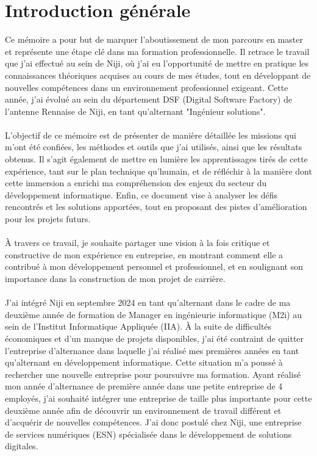 \documentclass[12pt]{article}
\begin{document}
\section{Introduction générale}
Ce mémoire a pour but de marquer l'aboutissement de mon parcours en master et représente une étape clé dans ma formation professionnelle. Il retrace le travail que j’ai effectué au sein de Niji, où j’ai eu l’opportunité de mettre en pratique les connaissances théoriques acquises au cours de mes études, tout en développant de nouvelles compétences dans un environnement professionnel exigeant. Cette année, j'ai évolué au sein du département DSF (Digital Software Factory) de l'antenne Rennaise de Niji, en tant qu'alternant "Ingénieur solutions".
\\\\
L’objectif de ce mémoire est de présenter de manière détaillée les missions qui m’ont été confiées, les méthodes et outils que j’ai utilisés, ainsi que les résultats obtenus. Il s’agit également de mettre en lumière les apprentissages tirés de cette expérience, tant sur le plan technique qu’humain, et de réfléchir à la manière dont cette immersion a enrichi ma compréhension des enjeux du secteur du développement informatique. Enfin, ce document vise à analyser les défis rencontrés et les solutions apportées, tout en proposant des pistes d’amélioration pour les projets futurs.
\\\\
À travers ce travail, je souhaite partager une vision à la fois critique et constructive de mon expérience en entreprise, en montrant comment elle a contribué à mon développement personnel et professionnel, et en soulignant son importance dans la construction de mon projet de carrière.
\\\\
J'ai intégré Niji en septembre 2024 en tant qu'alternant dans le cadre de ma deuxième année de formation de Manager en ingénieurie informatique (M2i) au sein de l'Institut Informatique Appliquée (IIA). À la suite de difficultés économiques et d'un manque de projets disponibles, j'ai été contraint de quitter l'entreprise d'alternance dans laquelle j'ai réalisé mes premières années en tant qu'alternant en développement informatique. Cette situation m'a poussé à rechercher une nouvelle entreprise pour poursuivre ma formation. Ayant réalisé mon année d'alternance de première année dans une petite entreprise de 4 employés, j'ai souhaité intégrer une entreprise de taille plus importante pour cette deuxième année afin de découvrir un environnement de travail différent et d'acquérir de nouvelles compétences. J'ai donc postulé chez Niji, une entreprise de services numériques (ESN) spécialisée dans le développement de solutions digitales.
\newpage
\end{document}
